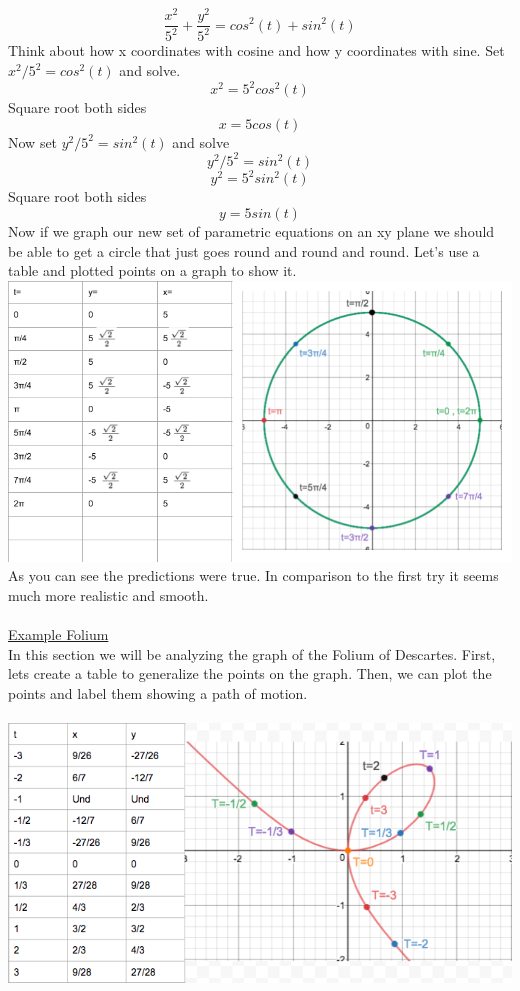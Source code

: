 \documentclass[a4paper,openright, 14pt]{article}
\begin{document}
$$\frac{x^2}{5^2} +\frac{y^2}{5^2}=cos^2 (t) + sin^2(t)$$
Think about how x coordinates with cosine and how y coordinates with sine. Set $x^2/5^2=cos^2(t)$ and solve.
$$x^2=5^2cos^2(t)$$
Square root both sides
$$x=5cos(t)$$
Now set $y^2/5^2=sin^2(t)$ and solve
$$y^2/5^2=sin^2(t)$$
$$y^2=5^2sin^2(t)$$
Square root both sides
$$y=5sin(t)$$
Now if we graph our new set of parametric equations on an xy plane we should be able to get a circle that just goes round and round and round. Let's use a table and plotted points on a graph to show it.\\
\includegraphics[width = 14 cm, height = 7 cm]{Josh2.png}\\
As you can see the predictions were true. In comparison to the first try it seems much more realistic and smooth.\\\\
\underline{Example Folium}\\
In this section we will be analyzing the graph of the Folium of Descartes. 
First, lets create a table to generalize the points on the graph. Then, we can plot the points and label them showing a path of motion.
\\\\
\includegraphics[width = 14 cm, height = 7 cm]{ST.png}
\end{document}
